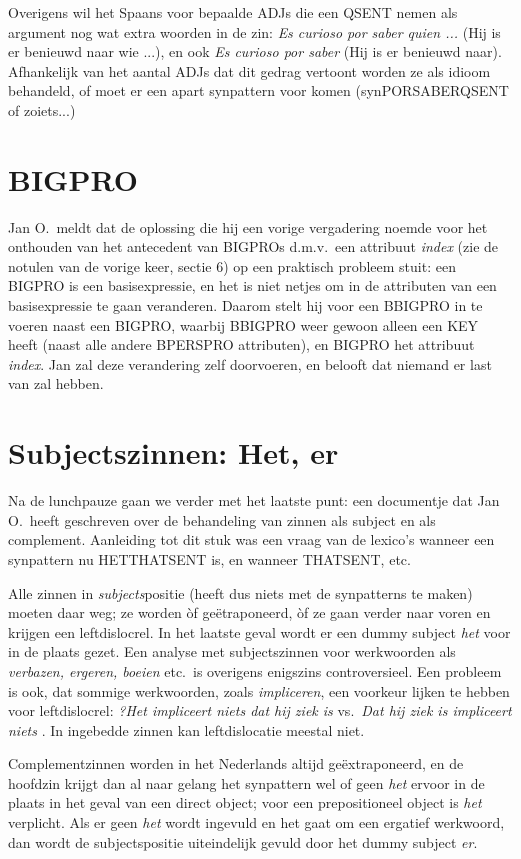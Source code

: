 Overigens wil het Spaans voor bepaalde ADJs die een QSENT nemen als argument 
nog wat extra woorden in de zin: {\em Es curioso {\em por saber} quien ...\/}
(Hij is er benieuwd naar wie ...), en ook {\em Es curioso por saber\/} (Hij is 
er benieuwd naar). Afhankelijk van het aantal ADJs dat dit gedrag vertoont
worden ze als idioom behandeld, of moet er een apart synpattern voor komen 
(synPORSABERQSENT of zoiets...)

\section{BIGPRO}
Jan O.\ meldt dat de oplossing die hij een vorige vergadering noemde voor het 
onthouden van het antecedent van BIGPROs d.m.v.\ een attribuut {\em index\/}
(zie de notulen van de vorige keer, sectie 6) op een praktisch probleem stuit:
een BIGPRO is een basisexpressie, en het is niet netjes om in de attributen van 
een basisexpressie te gaan veranderen. Daarom stelt hij voor een BBIGPRO in te 
voeren naast een BIGPRO, waarbij BBIGPRO weer gewoon alleen een KEY heeft 
(naast alle andere BPERSPRO attributen), en 
BIGPRO het attribuut {\em index\/}. Jan zal deze verandering zelf 
doorvoeren, en belooft dat niemand er last van zal hebben.

\section{Subjectszinnen: Het, er}
Na de lunchpauze gaan we verder met het laatste punt: een documentje dat Jan 
O.\ heeft geschreven over de behandeling van zinnen als subject en als 
complement. 
Aanleiding tot dit stuk was een vraag van de lexico's wanneer een synpattern nu 
HETTHATSENT is, en wanneer THATSENT, etc.

Alle zinnen in {\em subjects\/}positie (heeft dus niets met de synpatterns te 
maken)
moeten daar weg; ze worden \`{o}f ge\"{e}traponeerd, \`{o}f ze gaan verder naar 
voren en krijgen een leftdislocrel. In het laatste geval wordt er een dummy 
subject {\em het \/} voor in de plaats gezet. Een analyse met subjectszinnen 
voor werkwoorden als {\em verbazen, ergeren, boeien\/} etc.\ is overigens 
enigszins controversieel. Een probleem is ook, dat sommige werkwoorden, zoals 
{\em impliceren\/}, een voorkeur lijken te hebben voor leftdislocrel: {\em ?Het 
impliceert niets dat hij ziek is\/} vs.\ {\em Dat hij ziek is impliceert niets
\/}. In ingebedde zinnen kan leftdislocatie meestal niet.

Complementzinnen worden in het Nederlands altijd ge\"{e}xtraponeerd, en de hoofdzin 
krijgt dan al naar gelang het synpattern wel of geen {\em het\/} ervoor in de 
plaats in het geval van een direct object; voor een prepositioneel object is 
{\em het\/} verplicht. Als er geen {\em het\/} wordt ingevuld en het gaat om 
een ergatief werkwoord, dan wordt de subjectspositie uiteindelijk gevuld door het
dummy subject {\em er\/}.

